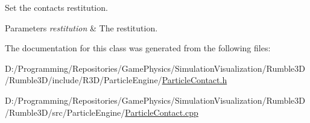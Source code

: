 Set the contact\textquotesingle{}s restitution. 


\begin{DoxyParams}{Parameters}
{\em restitution} & The restitution. \\
\hline
\end{DoxyParams}


The documentation for this class was generated from the following files\+:\begin{DoxyCompactItemize}
\item 
D\+:/\+Programming/\+Repositories/\+Game\+Physics/\+Simulation\+Visualization/\+Rumble3\+D/\+Rumble3\+D/include/\+R3\+D/\+Particle\+Engine/\mbox{\hyperlink{_particle_contact_8h}{Particle\+Contact.\+h}}\item 
D\+:/\+Programming/\+Repositories/\+Game\+Physics/\+Simulation\+Visualization/\+Rumble3\+D/\+Rumble3\+D/src/\+Particle\+Engine/\mbox{\hyperlink{_particle_contact_8cpp}{Particle\+Contact.\+cpp}}\end{DoxyCompactItemize}
